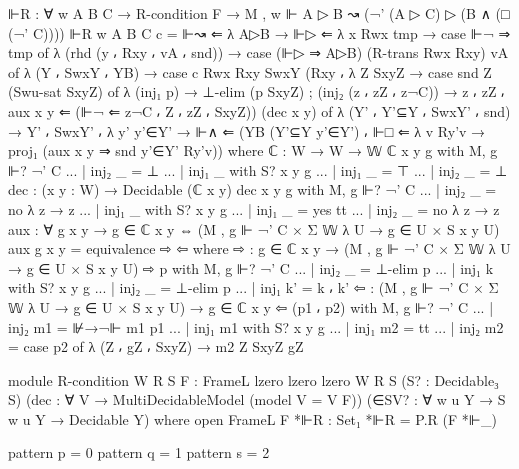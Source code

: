 \begin{spverbatim}
  ⊩R : ∀ {w A B C} → R-condition F →
    M , w ⊩ A ▷ B ↝ (¬' (A ▷ C) ▷ (B ∧ (□ (¬' C))))
  ⊩R {w} {A} {B} {C} c = ⊩↝ ⇐ λ A▷B → ⊩▷ ⇐ λ {x} Rwx tmp → case ⊩¬ ⇒ tmp of
    λ { (rhd (y ⸴ Rxy ⸴ vA ⸴ snd)) → case (⊩▷ ⇒ A▷B) (R-trans Rwx Rxy) vA of
    λ { (Y ⸴ SwxY ⸴ YB) → case c Rwx Rxy SwxY (Rxy
     ⸴ λ {Z} SxyZ → case snd Z (Swu-sat SxyZ) of
     λ { (inj₁ p) → ⊥-elim (p SxyZ)
     ; (inj₂ (z ⸴ zZ ⸴ z¬C)) → z ⸴ zZ ⸴ aux x y ⇐ (⊩¬ ⇐ z¬C ⸴ Z ⸴ zZ ⸴ SxyZ)}) (dec x y)
      of λ { (Y' ⸴ Y'⊆Y ⸴ SwxY' ⸴ snd) → Y' ⸴ SwxY' ⸴ λ { {y'} y'∈Y'
      → ⊩∧ ⇐ (YB (Y'⊆Y y'∈Y') ⸴ ⊩□ ⇐ λ { {v} Ry'v → proj₁ (aux x y ⇒ snd y'∈Y' Ry'v)})}}}}
      where
      ℂ : W → W → 𝕎
      ℂ x y g with M, g ⊩? ¬' C
      ... | inj₂ _ = ⊥
      ... | inj₁ _ with S? x y g
      ... | inj₁ _  = ⊤
      ... | inj₂ _ = ⊥
      dec : (x y : W) → Decidable (ℂ x y)
      dec x y g with M, g ⊩? ¬' C
      ... | inj₂ _ = no λ z → z
      ... | inj₁ _ with S? x y g
      ... | inj₁ _  = yes tt
      ... | inj₂ _ = no λ z → z
      aux : ∀ {g} x y → g ∈ ℂ x y ⇔ (M , g ⊩ ¬' C × Σ 𝕎 λ U → g ∈ U × S x y U)
      aux {g} x y = equivalence ⇨ ⇦
        where ⇨ : g ∈ ℂ x y → (M , g ⊩ ¬' C × Σ 𝕎 λ U → g ∈ U × S x y U)
              ⇨ p with M, g ⊩? ¬' C
              ... | inj₂ _ = ⊥-elim p
              ... | inj₁ k with S? x y g
              ... | inj₂ _ = ⊥-elim p
              ... | inj₁ k' = k ⸴ k'
              ⇦ : (M , g ⊩ ¬' C × Σ 𝕎 λ U → g ∈ U × S x y U) → g ∈ ℂ x y
              ⇦ (p1 ⸴ p2) with M, g ⊩? ¬' C
              ... | inj₂ m1 = ⊮→¬⊩ m1 p1
              ... | inj₁ m1 with S? x y g
              ... | inj₁ m2 = tt
              ... | inj₂ m2 = case p2 of λ { (Z ⸴ gZ ⸴ SxyZ) → m2 Z SxyZ gZ}

module R-condition
  {W R S}
  {F : FrameL {lzero} {lzero} {lzero} W R S}
  (S? : Decidable₃ S)
  (dec : ∀ V → MultiDecidableModel (model {V = V} F))
  (∈SV? : ∀ {w u Y} → S w u Y → Decidable Y)
  where
  open FrameL F
  *⊩R : Set₁
  *⊩R = P.R (F *⊩_)

  pattern p = 0
  pattern q = 1
  pattern s = 2


\end{spverbatim}
